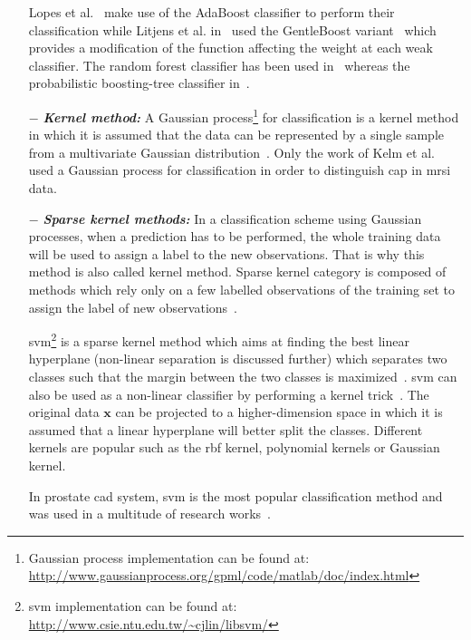\begin{enumerate}[leftmargin=*]
  Lopes et al.~\cite{Lopes2011} make use of the AdaBoost classifier to perform their classification while Litjens et al. in~\cite{Litjens2014} used the GentleBoost variant~\cite{Friedman1998} which provides a modification of the function affecting the weight at each weak classifier. The random forest classifier has been used in~\cite{Kelm2007,Litjens2014,Tiwari2012,Tiwari2013,Viswanath2009} whereas the probabilistic boosting-tree classifier in~\cite{Tiwari2009a,Tiwari2012,Tiwari2010,Viswanath2011}.

\item[$-$] \textbf{\textit{Kernel method:}} A Gaussian process\footnote{Gaussian process implementation can be found at: \url{http://www.gaussianprocess.org/gpml/code/matlab/doc/index.html}} for classification is a kernel method in which it is assumed that the data can be represented by a single sample from a multivariate Gaussian distribution~\cite{Rasmussen2005}. Only the work of Kelm et al.~\cite{Kelm2007} used a Gaussian process for classification in order to distinguish \ac{cap} in \ac{mrsi} data.

\item[$-$] \textbf{\textit{Sparse kernel methods:}} In a classification scheme using Gaussian processes, when a prediction has to be performed, the whole training data will be used to assign a label to the new observations. That is why this method is also called kernel method. Sparse kernel category is composed of methods which rely only on a few labelled observations of the training set to assign the label of new observations~\cite{Bishop2006}.

  \Acf{svm}\footnote{\ac{svm} implementation can be found at: \url{http://www.csie.ntu.edu.tw/~cjlin/libsvm/}} is a sparse kernel method which aims at finding the best linear hyperplane (non-linear separation is discussed further) which separates two classes such that the margin between the two classes is maximized~\cite{Vapnik1963}. \ac{svm} can also be used as a non-linear classifier by performing a kernel trick~\cite{Boser1992}. The original data $\mathbf{x}$ can be projected to a higher-dimension space in which it is assumed that a linear hyperplane will better split the classes. Different kernels are popular such as the \ac{rbf} kernel, polynomial kernels or Gaussian kernel.

  In prostate \ac{cad} system, \ac{svm} is the most popular classification method and was used in a multitude of research works~\cite{Artan2009,Artan2010,Chan2003,Kelm2007,Litjens2011,Litjens2012,Liu2013,Lopes2011,Niaf2011,Niaf2012,Ozer2009,Ozer2010,Parfait2012,Peng2013,Sung2011,Tiwari2012,Vos2008,Vos2008a,Vos2010,Vos2012}.


\end{enumerate}
